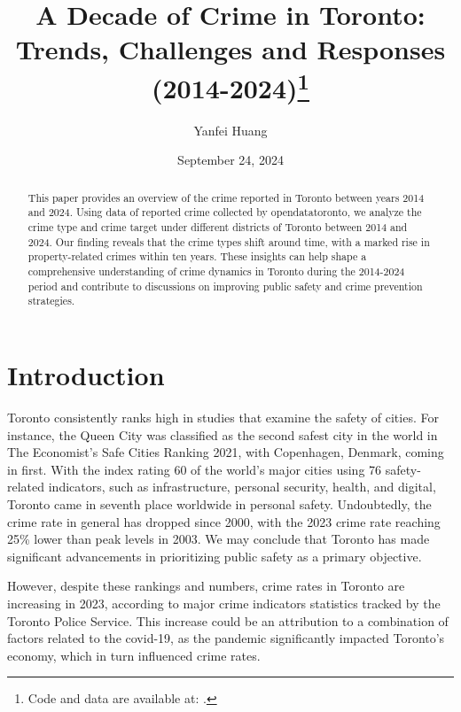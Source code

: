 \documentclass[
  letterpaper,
  DIV=11,
  numbers=noendperiod]{scrartcl}
\title{A Decade of Crime in Toronto: Trends, Challenges and Responses
(2014-2024)\thanks{Code and data are available at: .}}
\author{Yanfei Huang}
\date{September 24, 2024}
\begin{document}
\maketitle
\begin{abstract}
This paper provides an overview of the crime reported in Toronto between
years 2014 and 2024. Using data of reported crime collected by
opendatatoronto, we analyze the crime type and crime target under
different districts of Toronto between 2014 and 2024. Our finding
reveals that the crime types shift around time, with a marked rise in
property-related crimes within ten years. These insights can help shape
a comprehensive understanding of crime dynamics in Toronto during the
2014-2024 period and contribute to discussions on improving public
safety and crime prevention strategies.
\end{abstract}
\ifdefined\Shaded\renewenvironment{Shaded}{\begin{tcolorbox}[frame hidden, breakable, enhanced, interior hidden, sharp corners, borderline west={3pt}{0pt}{shadecolor}, boxrule=0pt]}{\end{tcolorbox}}\fi

\hypertarget{introduction}{%
\section{Introduction}\label{introduction}}

Toronto consistently ranks high in studies that examine the safety of
cities. For instance, the Queen City was classified as the second safest
city in the world in The Economist's Safe Cities Ranking 2021, with
Copenhagen, Denmark, coming in first. With the index rating 60 of the
world's major cities using 76 safety-related indicators, such as
infrastructure, personal security, health, and digital, Toronto came in
seventh place worldwide in personal safety. Undoubtedly, the crime rate
in general has dropped since 2000, with the 2023 crime rate reaching
25\% lower than peak levels in 2003. We may conclude that Toronto has
made significant advancements in prioritizing public safety as a primary
objective.

However, despite these rankings and numbers, crime rates in Toronto are
increasing in 2023, according to major crime indicators statistics
tracked by the Toronto Police Service. This increase could be an
attribution to a combination of factors related to the covid-19, as the
pandemic significantly impacted Toronto's economy, which in turn
influenced crime rates.
\end{document}

